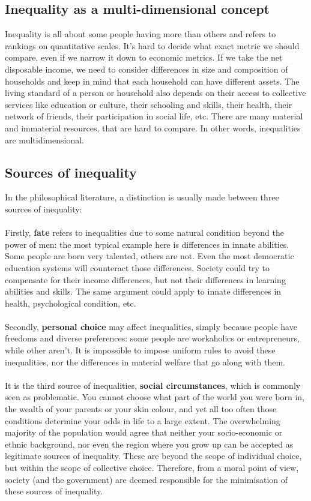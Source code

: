 \documentclass[../summary.tex]{subfiles}
\begin{document}
\subsection{Inequality as a multi-dimensional concept}

Inequality is all about some people having more than others and refers to rankings on quantitative scales. It's hard to decide what exact metric we should compare, even if we narrow it down to economic metrics. If we take the net disposable income, we need to consider differences in size and composition of households and keep in mind that each household can have different assets. The living standard of a person or household also depends on their access to collective services like education or culture, their schooling and skills, their health, their network of friends, their participation in social life, etc. There are many material and immaterial resources, that are hard to compare. In other words, inequalities are multidimensional.

\subsection{Sources of inequality}

In the philosophical literature, a distinction is usually made between three sources of inequality:
\\\\
Firstly, \textbf{fate} refers to inequalities due to some natural condition beyond the power of men: the most typical example here is differences in innate abilities. Some people are born very talented, others are not. Even the most democratic education systems will counteract those differences. Society could try to compensate for their income differences, but not their differences in learning abilities and skills. The same argument could apply to innate differences in health, psychological condition, etc.
\\\\
Secondly, \textbf{personal choice} may affect inequalities, simply because people have freedoms and diverse preferences: some people are workaholics or entrepreneurs, while other aren't. It is impossible to impose uniform rules to avoid these inequalities, nor the differences in material welfare that go along with them.
\\\\
It is the third source of inequalities, \textbf{social circumstances}, which is commonly seen as problematic. You cannot choose what part of the world you were born in, the wealth of your parents or your skin colour, and yet all too often those conditions determine your odds in life to a large extent. The overwhelming majority of the population would agree that neither your socio-economic or ethnic background, nor even the region where you grow up can be accepted as legitimate sources of inequality. These are beyond the scope of individual choice, but within the scope of collective choice. Therefore, from a moral point of view, society (and the government) are deemed responsible for the minimisation of these sources of inequality.
\end{document}
